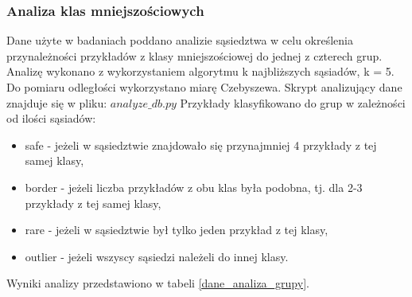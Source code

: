 \subsubsection{Analiza klas mniejszościowych}
Dane użyte w badaniach poddano analizie sąsiedztwa w celu określenia przynależności przykładów z klasy mniejszościowej do jednej z czterech grup. Analizę wykonano z wykorzystaniem algorytmu k najbliższych sąsiadów, k = 5. Do pomiaru odległości wykorzystano miarę Czebyszewa. Skrypt analizujący dane znajduje się w pliku: $analyze\_db.py$ Przykłady klasyfikowano do grup w zależności od ilości sąsiadów\cite{przykladyklas}:
\begin{itemize}
	\item safe - jeżeli w sąsiedztwie znajdowało się przynajmniej 4 przykłady z tej samej klasy,
	\item border - jeżeli liczba przykładów z obu klas była podobna, tj. dla 2-3 przykłady z tej samej klasy,
	\item rare - jeżeli w sąsiedztwie był tylko jeden przykład z tej klasy,
	\item outlier - jeżeli wszyscy sąsiedzi należeli do innej klasy.
\end{itemize}
Wyniki analizy przedstawiono w tabeli \ref{dane_analiza_grupy}.
